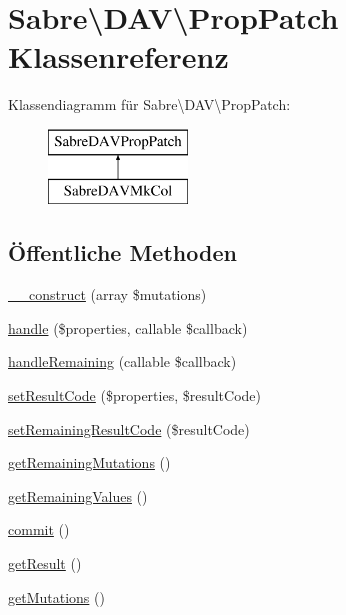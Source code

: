 \hypertarget{class_sabre_1_1_d_a_v_1_1_prop_patch}{}\section{Sabre\textbackslash{}D\+AV\textbackslash{}Prop\+Patch Klassenreferenz}
\label{class_sabre_1_1_d_a_v_1_1_prop_patch}
Klassendiagramm für Sabre\textbackslash{}D\+AV\textbackslash{}Prop\+Patch\+:\begin{figure}[H]
\begin{center}
\leavevmode
\includegraphics[height=2.000000cm]{class_sabre_1_1_d_a_v_1_1_prop_patch}
\end{center}
\end{figure}
\subsection*{Öffentliche Methoden}
\begin{DoxyCompactItemize}
\item 
\mbox{\hyperlink{class_sabre_1_1_d_a_v_1_1_prop_patch_a8e9765d3a06e62c02c7d456783a92b64}{\+\_\+\+\_\+construct}} (array \$mutations)
\item 
\mbox{\hyperlink{class_sabre_1_1_d_a_v_1_1_prop_patch_a8557ab29cd9f90c1d2459a6848338315}{handle}} (\$properties, callable \$callback)
\item 
\mbox{\hyperlink{class_sabre_1_1_d_a_v_1_1_prop_patch_a9908d93d975bc2cf4d85e8dbff42cd92}{handle\+Remaining}} (callable \$callback)
\item 
\mbox{\hyperlink{class_sabre_1_1_d_a_v_1_1_prop_patch_a9112bf164a32f52e6967c9cace1eecb8}{set\+Result\+Code}} (\$properties, \$result\+Code)
\item 
\mbox{\hyperlink{class_sabre_1_1_d_a_v_1_1_prop_patch_ae1af4f2a5645b3c72bb2ab8359562452}{set\+Remaining\+Result\+Code}} (\$result\+Code)
\item 
\mbox{\hyperlink{class_sabre_1_1_d_a_v_1_1_prop_patch_aa99c5975683d4d41a7f20d660380575a}{get\+Remaining\+Mutations}} ()
\item 
\mbox{\hyperlink{class_sabre_1_1_d_a_v_1_1_prop_patch_a4ef0dca1d6eafc8bf30fa1ede367cecb}{get\+Remaining\+Values}} ()
\item 
\mbox{\hyperlink{class_sabre_1_1_d_a_v_1_1_prop_patch_a17d4198c780f4b4e1bb36943506d67e1}{commit}} ()
\item 
\mbox{\hyperlink{class_sabre_1_1_d_a_v_1_1_prop_patch_afbe27359bdd164d4a3ebcb66fb61fd73}{get\+Result}} ()
\item 
\mbox{\hyperlink{class_sabre_1_1_d_a_v_1_1_prop_patch_af414b039ec976327251bd681765f33c5}{get\+Mutations}} ()
\end{DoxyCompactItemize}
